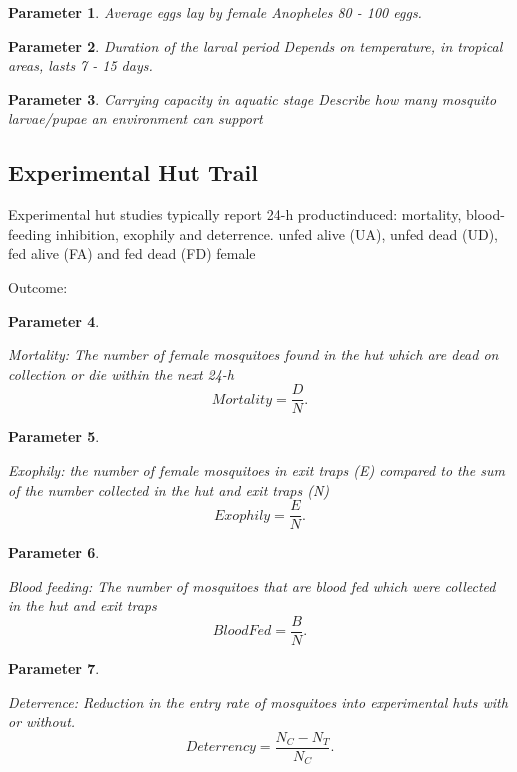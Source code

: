 \documentclass[a4paper, 12pt, twoside]{article}
\newtheorem{parameter}{Parameter}
\begin{document}
\begin{parameter}
	{Average eggs lay by female \textit{Anopheles}}
	80 - 100 eggs.
\end{parameter}

\begin{parameter}
	{Duration of the larval period}
	Depends on temperature, in tropical areas, lasts 7 - 15 days.\cite{bayoh_lindsay_2003}
\end{parameter}

\begin{parameter}
	{Carrying capacity in aquatic stage}
	Describe how many mosquito larvae/pupae an environment can support
\end{parameter}

\subsection{Experimental Hut Trail}
Experimental hut studies typically report 24-h productinduced: mortality, blood-feeding inhibition, exophily and deterrence.
unfed alive (UA), unfed dead (UD), fed alive (FA) and fed dead (FD) female

Outcome:

\begin{parameter}
	\label{eht:mortality}

	Mortality: The number of female mosquitoes found in the hut which are dead on collection or die within the next 24-h
	\[
		Mortality = \frac{D}{N}
		.\]
\end{parameter}


\begin{parameter}
	\label{eht:exophily}

	Exophily: the number of female mosquitoes in exit traps (E) compared to the sum of the number collected in the hut and exit traps (N)
	\[
		Exophily = \frac{E}{N}
		.\]

\end{parameter}

\begin{parameter}
	\label{eht:blood_fed}

	Blood feeding: The number of mosquitoes that are blood fed which were collected in the hut and exit traps
	\[
		BloodFed = \frac{B}{N}
		.\]
\end{parameter}

\begin{parameter}
	\label{eht:Deterrence}

	Deterrence: Reduction in the entry rate of mosquitoes into experimental huts with or without.
	\[
		Deterrency = \frac{N_C - N_T}{N_C}
		.\]
\end{parameter}
\end{document}
